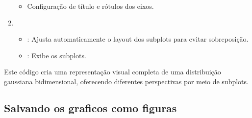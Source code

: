 \documentclass[letterpaper,10pt,english]{jupyterBook}
\begin{document}
\begin{enumerate}
\begin{itemize}
\item {} 
\sphinxAtStartPar
Configuração de título e rótulos dos eixos.

\end{itemize}

\item {} 
\sphinxAtStartPar
{}
\begin{itemize}
\item {} 
\sphinxAtStartPar
{}: Ajusta automaticamente o layout dos subplots para evitar sobreposição.

\item {} 
\sphinxAtStartPar
{}: Exibe os subplots.

\end{itemize}

\end{enumerate}

\sphinxAtStartPar
Este código cria uma representação visual completa de uma distribuição gaussiana bidimensional, oferecendo diferentes perspectivas por meio de subplots.


\subsection{Salvando os graficos como figuras}
\label{\detokenize{chapters/ch7/ch7:salvando-os-graficos-como-figuras}}
\end{document}
